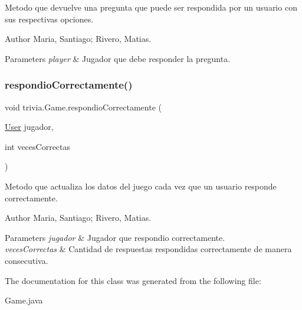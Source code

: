 Metodo que devuelve una pregunta que puede ser respondida por un usuario con sus respectivas opciones. \begin{DoxyAuthor}{Author}
Maria, Santiago; Rivero, Matias. 
\end{DoxyAuthor}

\begin{DoxyParams}{Parameters}
{\em player} & Jugador que debe responder la pregunta. \\
\hline
\end{DoxyParams}
\mbox{\label{classtrivia_1_1Game_ab5041f892c2f683775d09f2eee17e8d2}} 
\subsubsection{\texorpdfstring{respondio\+Correctamente()}{respondioCorrectamente()}}
{\footnotesize\ttfamily void trivia.\+Game.\+respondio\+Correctamente (\begin{DoxyParamCaption}\item[{\mbox{\hyperlink{classtrivia_1_1User}{User}}}]{jugador,  }\item[{int}]{veces\+Correctas }\end{DoxyParamCaption})\hspace{0.3cm}{\ttfamily [inline]}}

Metodo que actualiza los datos del juego cada vez que un usuario responde correctamente. \begin{DoxyAuthor}{Author}
Maria, Santiago; Rivero, Matias. 
\end{DoxyAuthor}

\begin{DoxyParams}{Parameters}
{\em jugador} & Jugador que respondio correctamente. \\
\hline
{\em veces\+Correctas} & Cantidad de respuestas respondidas correctamente de manera consecutiva. \\
\hline
\end{DoxyParams}


The documentation for this class was generated from the following file\+:\begin{DoxyCompactItemize}
\item 
Game.\+java\end{DoxyCompactItemize}
